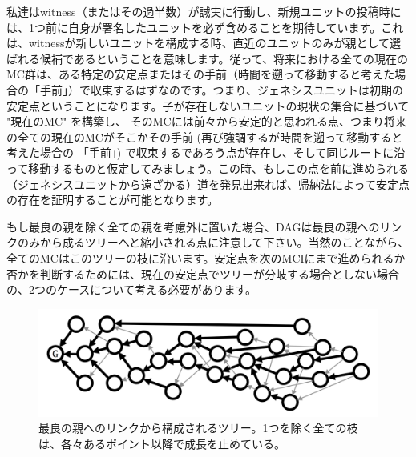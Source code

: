 \documentclass[a4paper, dvipdfmx]{jsarticle}
\begin{document}
私達はwitness（またはその過半数）が誠実に行動し、新規ユニットの投稿時には、1つ前に自身が署名したユニットを必ず含めることを期待しています。これは、witnessが新しいユニットを構成する時、直近のユニットのみが親として選ばれる候補であるということを意味します。従って、将来における全ての現在のMC群は、ある特定の安定点またはその手前（時間を遡って移動すると考えた場合の「手前」）で収束するはずなのです。つまり、ジェネシスユニットは初期の安定点ということになります。子が存在しないユニットの現状の集合に基づいて "現在のMC" を構築し、 そのMCには前々から安定的と思われる点、つまり将来の全ての現在のMCがそこかその手前 (再び強調するが時間を遡って移動すると考えた場合の 「手前」) で収束するであろう点が存在し、そして同じルートに沿って移動するものと仮定してみましょう。この時、もしこの点を前に進められる（ジェネシスユニットから遠ざかる）道を発見出来れば、帰納法によって安定点の存在を証明することが可能となります。

もし最良の親を除く全ての親を考慮外に置いた場合、DAGは最良の親へのリンクのみから成るツリーへと縮小される点に注意して下さい。当然のことながら、全てのMCはこのツリーの枝に沿います。安定点を次のMCIにまで進められるか否かを判断するためには、現在の安定点でツリーが分岐する場合としない場合の、2つのケースについて考える必要があります。

\begin{figure}[htbp]
  \includegraphics[width=\linewidth]{fig5.png}
  \caption{最良の親へのリンクから構成されるツリー。1つを除く全ての枝は、各々あるポイント以降で成長を止めている。}
\end{figure}
\end{document}
